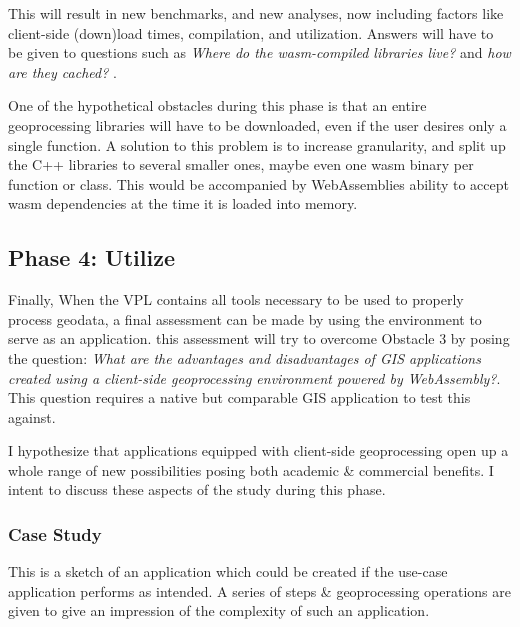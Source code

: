 This will result in new benchmarks, and new analyses, now including factors like client-side (down)load times, compilation, and utilization. Answers will have to be given to questions such as \textit{Where do the wasm-compiled libraries live?} and \textit{ how are they cached? }.

One of the hypothetical obstacles during this phase is that an entire geoprocessing libraries will have to be downloaded, even if the user desires only a single function. A solution to this problem is to increase granularity, and split up the C++ libraries to several smaller ones, maybe even one wasm binary per function or class. This would be accompanied by WebAssemblies ability to accept \ac{wasm} dependencies at the time it is loaded into memory. 




\subsection{Phase 4: Utilize}

Finally, When the VPL contains all tools necessary to be used to properly process geodata, a final assessment can be made by using the environment to serve as an application. this assessment will try to overcome Obstacle 3 by posing the question: \textit{What are the advantages and disadvantages of GIS applications created using a client-side geoprocessing environment powered by WebAssembly?}. This question requires a native but comparable GIS application to test this against.  

I hypothesize that applications equipped with client-side geoprocessing open up a whole range of new possibilities posing both academic \& commercial benefits. 
I intent to discuss these aspects of the study during this phase. 




\subsubsection*{Case Study}

This is a sketch of an application which could be created if the use-case application performs as intended. A series of steps \& geoprocessing operations are given to give an impression of the complexity of such an application.

